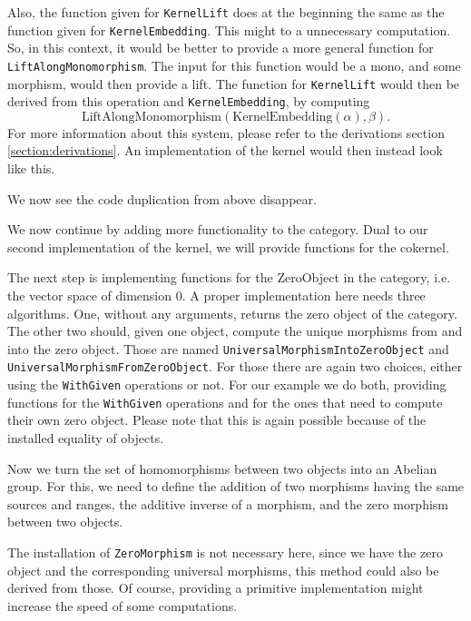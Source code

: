 Also, the function given for \texttt{KernelLift} does at the beginning the same as the function given for \texttt{KernelEmbedding}. This might to
a unnecessary computation. So, in this context, it would be better to provide a more general function for \texttt{LiftAlongMonomorphism}.
The input for this function would be a mono, and some morphism, would then provide a lift. The function for \texttt{KernelLift} would then be derived
from this operation and \texttt{KernelEmbedding}, by computing
\[
 \mathrm{LiftAlongMonomorphism} \left( \mathrm{KernelEmbedding} \left( \alpha \right), \beta \right).
\]
For more information about this system, please refer to the derivations section \ref{section:derivations}.
An implementation of the kernel would then instead look like this.



We now see the code duplication from above disappear.

We now continue by adding more functionality to the category. Dual to our second implementation of the kernel,
we will provide functions for the cokernel.



The next step is implementing functions for the \textrm{ZeroObject} in the category, i.e. the vector space
of dimension 0. A proper implementation here needs three algorithms. One, without any arguments, returns the
zero object of the category. The other two should, given one object, compute the unique morphisms from and into
the zero object. Those are named \texttt{UniversalMorphismIntoZeroObject} and \texttt{UniversalMorphismFromZeroObject}.
For those there are again two choices, either using the \texttt{WithGiven} operations or not.
For our example we do both, providing functions for the \texttt{WithGiven} operations and for the ones that
need to compute their own zero object. Please note that this is again possible because of the installed equality of objects.



Now we turn the set of homomorphisms between two objects into an Abelian group. For this, we need to define the addition of
two morphisms having the same sources and ranges, the additive inverse of a morphism, and the zero morphism between two objects.



The installation of \texttt{ZeroMorphism} is not necessary here, since we have the zero object and the corresponding
universal morphisms, this method could also be derived from those. Of course, providing a primitive implementation might
increase the speed of some computations.

